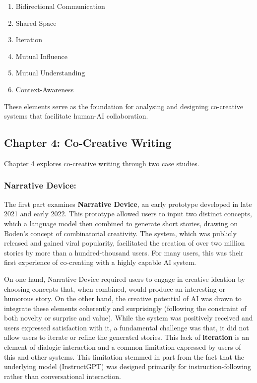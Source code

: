 \begin{enumerate}[label=\arabic*.]
    \item Bidirectional Communication
    \item Shared Space
    \item Iteration
    \item Mutual Influence
    \item Mutual Understanding
    \item Context-Awareness
\end{enumerate}

These elements serve as the foundation for analysing and designing co-creative systems that facilitate human-AI collaboration.

\subsection*{Chapter 4: Co-Creative Writing}

Chapter 4 explores co-creative writing through two case studies. 

\subsubsection{Narrative Device: } The first part examines \textbf{Narrative Device}, an early prototype developed in late 2021 and early 2022. This prototype allowed users to input two distinct concepts, which a language model then combined to generate short stories, drawing on Boden’s concept of combinatorial creativity. The system, which was publicly released and gained viral popularity, facilitated the creation of over two million stories by more than a hundred-thousand users. For many users, this was their first experience of co-creating with a highly capable AI system.

On one hand, Narrative Device required users to engage in creative ideation by choosing concepts that, when combined, would produce an interesting or humorous story. On the other hand, the creative potential of AI was drawn to integrate these elements coherently and surprisingly (following the constraint of both novelty or surprise and value). While the system was positively received and users expressed satisfaction with it, a fundamental challenge was that, it did not allow users to iterate or refine the generated stories. This lack of \textbf{iteration} is an element of dialogic interaction and a common limitation expressed by users of this and other systems. This limitation stemmed in part from the fact that the underlying model (InstructGPT) was designed primarily for instruction-following rather than conversational interaction.

